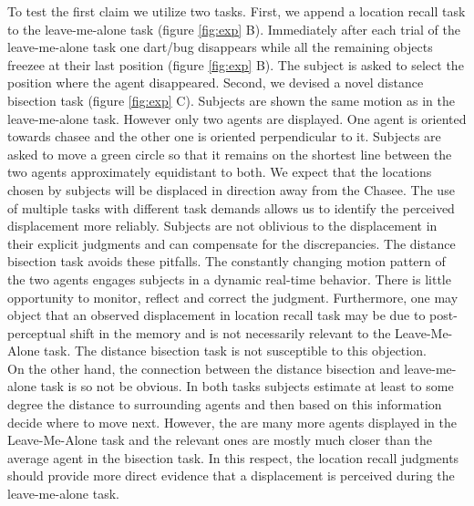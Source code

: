 \documentclass[10pt]{article}
\begin{document}
To test the first claim we utilize two tasks. 
First, we append a location recall task to the leave-me-alone task (figure \ref{fig:exp} B). 
Immediately after each trial of the leave-me-alone task one dart/bug disappears while all the remaining objects freezee at their last position (figure \ref{fig:exp} B). 
The subject is asked to select the position where the agent disappeared.
Second, we devised a novel distance bisection task (figure \ref{fig:exp} C). 
Subjects are shown the same motion as in the leave-me-alone task. 
However only two agents are displayed. 
One agent is oriented towards chasee and the other one is oriented perpendicular to it. 
Subjects are asked to move a green circle so that it remains on the shortest line between the two agents approximately equidistant to both. 
We expect that the locations chosen by subjects will be displaced in direction away from the Chasee. 
The use of multiple tasks with different task demands allows us to identify the perceived displacement more reliably. 
Subjects are not oblivious to the displacement in their explicit judgments and can compensate for the discrepancies. %
The distance bisection task avoids these pitfalls.
The constantly changing motion pattern of the two agents engages subjects in a dynamic real-time behavior. 
There is little opportunity to monitor, reflect and correct the judgment. 
Furthermore, one may object that an observed displacement in location recall task may be due to post-perceptual shift in the memory and is not necessarily relevant to the Leave-Me-Alone task. 
The distance bisection task is not susceptible to this objection.\\
On the other hand, the connection between the distance bisection and leave-me-alone task is so not be obvious. 
In both tasks subjects estimate at least to some degree the distance to surrounding agents and then based on this information decide where to move next. 
However, the are many more agents displayed in the Leave-Me-Alone task and the relevant ones are mostly much closer than the average agent in the bisection task. 
In this respect, the location recall judgments should provide more direct evidence that a displacement is perceived during the leave-me-alone task. \\
\end{document}
